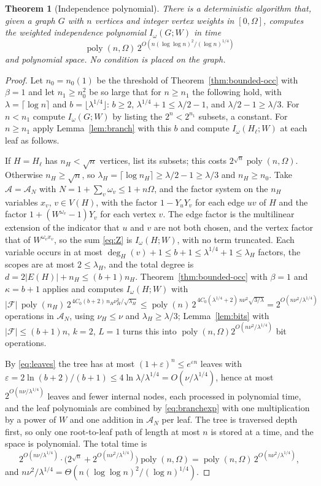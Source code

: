\documentclass[11pt,reqno]{amsart}
\numberwithin{equation}{section}
\theoremstyle{plain}
\newtheorem{theorem}{Theorem}[section]
\theoremstyle{definition}
\theoremstyle{remark}
\DeclareMathOperator{\poly}{poly}
\newcommand{\A}{\mathcal{A}}
\newcommand{\F}{\mathcal{F}}
\begin{document}
\begin{theorem}[Independence polynomial]\label{thm:indep}
There is a deterministic algorithm that, given a graph $G$ with $n$ vertices and
integer vertex weights in $[0,\Omega]$, computes the weighted independence
polynomial $I_\omega(G;W)$ in time
\[
  \poly(n,\Omega)\,2^{O(n(\log\log n)^2/(\log n)^{1/4})}
\]
and polynomial space. No condition is placed on the graph.
\end{theorem}

\begin{proof}
Let $n_0=n_0(1)$ be the threshold of Theorem~\ref{thm:bounded-occ} with $\beta=1$
and let $n_1\ge n_0^2$ be so large that for $n\ge n_1$ the following hold, with
$\lambda=\lceil\log n\rceil$ and $b=\lfloor\lambda^{1/4}\rfloor$: $b\ge2$,
$\lambda^{1/4}+1\le\lambda/2-1$, and $\lambda/2-1\ge\lambda/3$. For $n<n_1$
compute $I_\omega(G;W)$ by listing the $2^{n}<2^{n_1}$ subsets, a constant. For
$n\ge n_1$ apply Lemma~\ref{lem:branch} with this $b$ and compute
$I_\omega(H_\ell;W)$ at each leaf as follows.

If $H=H_\ell$ has $n_H<\sqrt n$ vertices, list its subsets; this costs
$2^{\sqrt n}\poly(n,\Omega)$. Otherwise $n_H\ge\sqrt n$, so
$\lambda_H=\lceil\log n_H\rceil\ge\lambda/2-1\ge\lambda/3$ and $n_H\ge n_0$. Take
$\A=\A_N$ with $N=1+\sum_v\omega_v\le1+n\Omega$, and the factor system on the
$n_H$ variables $x_v$, $v\in V(H)$, with the factor $1-Y_uY_v$ for each edge
$uv$ of $H$ and the factor $1+(W^{\omega_v}-1)Y_v$ for each vertex $v$. The
edge factor is the multilinear extension of the indicator that $u$ and $v$ are
not both chosen, and the vertex factor that of $W^{\omega_vx_v}$, so the sum
\eqref{eq:Z} is $I_\omega(H;W)$, with no term truncated. Each variable occurs in
at most $\deg_H(v)+1\le b+1\le\lambda^{1/4}+1\le\lambda_H$ factors, the scopes are
at most $2\le\lambda_H$, and the total degree is
$d=2|E(H)|+n_H\le(b+1)n_H$. Theorem~\ref{thm:bounded-occ} with $\beta=1$ and
$\kappa=b+1$ applies and computes $I_\omega(H;W)$ with
\[
  |\F|\,\poly(n_H)\,2^{\,4C_0(b+2)\,n_H\nu_H^2/\sqrt{\lambda_H}}
  \le\poly(n)\,2^{\,4C_0(\lambda^{1/4}+2)\,n\nu^2\sqrt{3/\lambda}}
  =2^{O(n\nu^2/\lambda^{1/4})}
\]
operations in $\A_N$, using $\nu_H\le\nu$ and $\lambda_H\ge\lambda/3$;
Lemma~\ref{lem:bits} with $|\F|\le(b+1)n$, $k=2$, $L=1$ turns this into
$\poly(n,\Omega)2^{O(n\nu^2/\lambda^{1/4})}$ bit operations.

By \eqref{eq:leaves} the tree has at most $(1+\varepsilon)^n\le e^{\varepsilon n}$
leaves with $\varepsilon=2\ln(b+2)/(b+1)\le 4\ln\lambda/\lambda^{1/4}=O(\nu/\lambda^{1/4})$,
hence at most $2^{O(n\nu/\lambda^{1/4})}$ leaves and fewer internal nodes, each
processed in polynomial time, and the leaf polynomials are combined by
\eqref{eq:branchexp} with one multiplication by a power of $W$ and one addition
in $\A_N$ per leaf. The tree is traversed depth first, so only one root-to-leaf
path of length at most $n$ is stored at a time, and the space is polynomial. The
total time is
\[
  2^{O(n\nu/\lambda^{1/4})}\cdot\bigl(2^{\sqrt n}+2^{O(n\nu^2/\lambda^{1/4})}\bigr)\poly(n,\Omega)
  =\poly(n,\Omega)\,2^{O(n\nu^2/\lambda^{1/4})},
\]
and $n\nu^2/\lambda^{1/4}=\Theta(n(\log\log n)^2/(\log n)^{1/4})$.
\end{proof}
\end{document}
